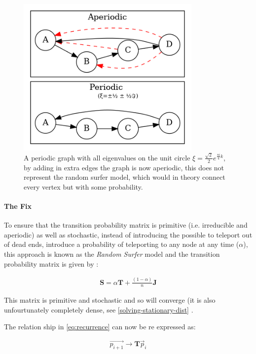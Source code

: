\documentclass[11pt]{article}
\begin{document}
\begin{figure}[htbp]
\centering
\includegraphics[width=9cm]{media/dot/aperiodic.dot.png}
\caption{\label{fig:aperiodic}A periodic graph with all eigenvalues on the unit circle \(\xi = \frac{\sqrt{2}}{2} e^{\frac{\pi i}{4} k}\), by adding in extra edges the graph is now aperiodic, this does not represent the random surfer model, which would in theory connect every vertex but with some probability.}
\end{figure}

\paragraph{The Fix}
\label{fix}
To ensure that the transition probability matrix is primitive (i.e. irreducible and aperiodic) as well as stochastic, instead of introducing the possible to teleport out of dead ends, introduce a probability of teleporting to any node at any time (\(\alpha\)), this approach is known as the \emph{Random Surfer} model and the transition probability matrix is given by \cite{larrypageAnatomyLargescaleHypertextual1998} :

\begin{align}
\mathbf{S} = \alpha \mathbf{T} + \frac{(1- \alpha)}{n} \mathbf{J} \label{eq:random-surfer}
\end{align}

This matrix is primitive and stochastic and so will converge (it is also unfourtunately completely dense, see \ref{solving-stationary-dist} \cite[]{langvilleGooglePageRankScience2012}.

The relation ship in \eqref{eq:recurrence} can now be re expressed as:

\begin{align}
\vec{p_{i+1}} \rightarrow \mathbf{T} \vec{p}_{i} \label{eq:random-surfer-recurrence}
\end{align}
\end{document}
